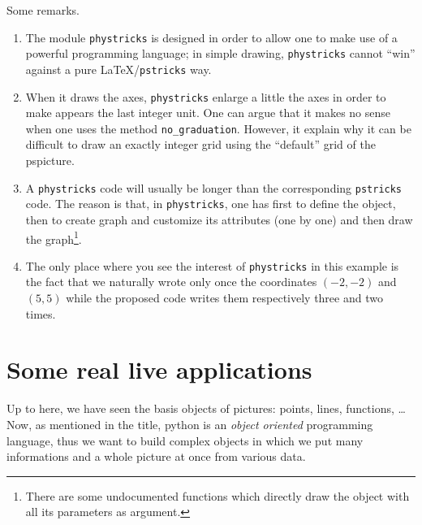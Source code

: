 Some remarks. 
\begin{enumerate}

	\item
		The module \verb+phystricks+ is designed in order to allow one to make use of a powerful programming language; in simple drawing, \verb+phystricks+ cannot ``win'' against a pure \LaTeX/\verb+pstricks+ way.

	\item
		When it draws the axes, \verb+phystricks+ enlarge a little the axes in order to make appears the last integer unit. One can argue that it makes no sense when one uses the method \verb+no_graduation+. However, it explain why it can be difficult to draw an exactly integer grid using the ``default'' grid of the pspicture.
		
	\item
		A \verb+phystricks+ code will usually be longer than the corresponding \verb+pstricks+ code. The reason is that, in \verb+phystricks+,  one has first to define the object, then to create graph and customize its attributes (one by one) and then draw the graph\footnote{There are some undocumented functions which directly draw the object with all its parameters as argument.}. 

	\item
		The only place where you see the interest of \verb+phystricks+ in this example is the fact that we naturally wrote only once the coordinates $(-2,-2)$ and $(5,5)$ while the proposed code writes them respectively three and two times.

\end{enumerate}

\section{Some real live applications}

Up to here, we have seen the basis objects of pictures: points, lines, functions, \ldots Now, as mentioned in the title, python is an \emph{object oriented} programming language, thus we want to build complex objects in which we put many informations and a whole picture at once from various data.


